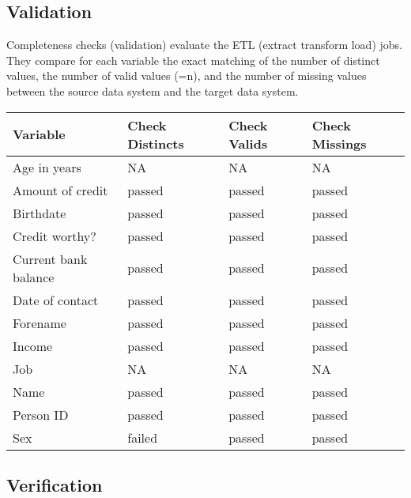 \documentclass[
]{article}
\begin{document}
\hypertarget{validation}{%
\subsection{Validation}\label{validation}}

Completeness checks (validation) evaluate the ETL (extract transform
load) jobs. They compare for each variable the exact matching of the
number of distinct values, the number of valid values (=n), and the
number of missing values between the source data system and the target
data system.

\begin{table}[H]
\centering
\begin{tabular}{l|l|l|l}
\hline
\textbf{Variable} & \textbf{Check Distincts} & \textbf{Check Valids} & \textbf{Check Missings}\\
\hline
Age in years & NA & NA & NA\\
\hline
Amount of credit & passed & passed & passed\\
\hline
Birthdate & passed & passed & passed\\
\hline
Credit worthy? & passed & passed & passed\\
\hline
Current bank balance & passed & passed & passed\\
\hline
Date of contact & passed & passed & passed\\
\hline
Forename & passed & passed & passed\\
\hline
Income & passed & passed & passed\\
\hline
Job & NA & NA & NA\\
\hline
Name & passed & passed & passed\\
\hline
Person ID & passed & passed & passed\\
\hline
Sex & failed & passed & passed\\
\hline
\end{tabular}
\end{table}

\hypertarget{verification}{%
\subsection{Verification}\label{verification}}
\end{document}
